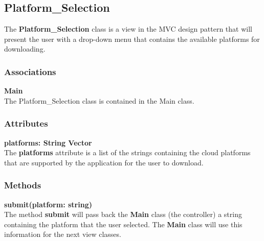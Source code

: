 \subsection{Platform\_Selection}
The \textbf{Platform\_Selection} class is a view in the MVC design pattern that will present
the user with a drop-down menu that contains the available platforms for downloading.

\subsubsection{Associations}
\textbf{Main} \\
The Platform\_Selection class is contained in the Main class.


\subsubsection{Attributes}
\textbf{platforms: String Vector} \\
The \textbf{platforms} attribute is a list of the strings containing the cloud platforms that
are supported by the application for the user to download.

\subsubsection{Methods}
\textbf{submit(platform: string)} \\
The method \textbf{submit} will pass back the \textbf{Main} class (the controller) a string
containing the platform that the user selected. The \textbf{Main} class will use this information
for the next view classes.
  
